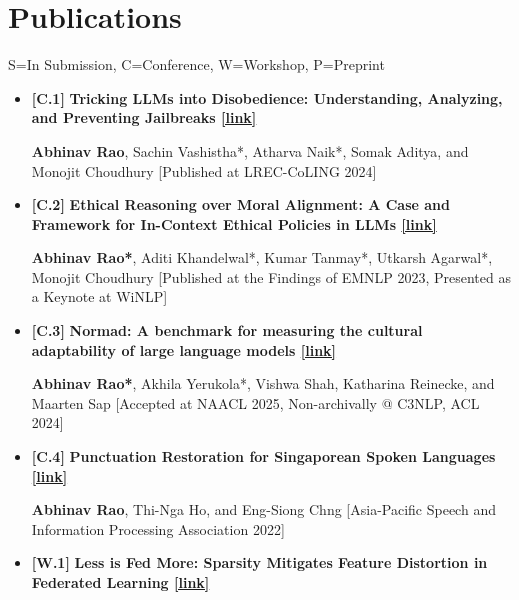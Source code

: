 \documentclass[11pt,letterpaper]{article}
\begin{document}
\section*{Publications}
\small{S=In Submission, C=Conference, W=Workshop, P=Preprint}

\begin{itemize}[leftmargin=*,label={},itemsep=4pt]
    \item {\color{maincolor}\textbf{[C.1]}} \textbf{Tricking LLMs into Disobedience: Understanding, Analyzing, and Preventing Jailbreaks \href{https://aclanthology.org/2024.lrec-main.1462/}{[link]}}  
          
        \textbf{Abhinav Rao}, Sachin Vashistha*, Atharva Naik*, Somak Aditya, and Monojit Choudhury
        [Published at LREC-CoLING 2024]
    
       
    \item {\color{maincolor}\textbf{[C.2]}} \textbf{Ethical Reasoning over Moral Alignment: A Case and Framework for In-Context Ethical Policies in LLMs \href{https://aclanthology.org/2023.findings-emnlp.892/}{[link]}}  
          
    \textbf{Abhinav Rao*}, Aditi Khandelwal*, Kumar Tanmay*, Utkarsh Agarwal*, Monojit Choudhury
        [Published at the Findings of EMNLP 2023, Presented as a Keynote at WiNLP]
    
       
    \item {\color{maincolor}\textbf{[C.3]}} \textbf{Normad: A benchmark for measuring the cultural adaptability of large language models \href{https://arxiv.org/abs/2404.12464}{[link]}}  
          
        \textbf{Abhinav Rao*}, Akhila Yerukola*, Vishwa Shah, Katharina Reinecke, and Maarten Sap
        [Accepted at NAACL 2025, Non-archivally @ C3NLP, ACL 2024]
    
       
    \item {\color{maincolor}\textbf{[C.4]}} \textbf{Punctuation Restoration for Singaporean Spoken Languages \href{https://arxiv.org/abs/2212.05356}{[link]}}  
          
    \textbf{Abhinav Rao}, Thi-Nga Ho, and Eng-Siong Chng
        [Asia-Pacific Speech and Information Processing Association 2022]
    
       
    \item {\color{maincolor}\textbf{[W.1]}} \textbf{Less is Fed More: Sparsity Mitigates Feature Distortion in Federated Learning \href{https://aclanthology.org/2024.customnlp4u-1.4/}{[link]}}  
          

\end{itemize}
\end{document}

